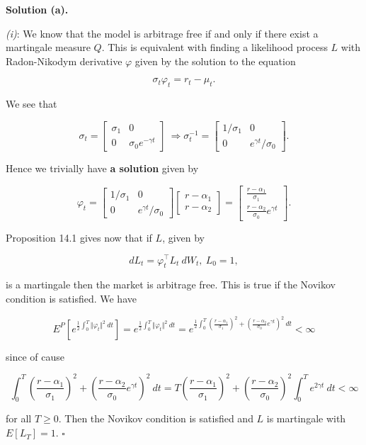 \documentclass[
]{book}
\begin{document}
\textbf{Solution (a).}

\emph{(i)}: We know that the model is arbitrage free if and only if there exist a martingale measure \(Q\). This is equivalent with finding a likelihood process \(L\) with Radon-Nikodym derivative \(\varphi\) given by the solution to the equation

\[
\sigma_t\varphi_t=r_t-\mu_t.
\]

We see that

\[
\sigma_t=
\begin{bmatrix}
\sigma_1 & 0\\
0 & \sigma_0e^{-\gamma t}
\end{bmatrix}\ \Rightarrow
\sigma_t^{-1}=
\begin{bmatrix}
1/\sigma_1 & 0\\
0 & e^{\gamma t}/\sigma_0
\end{bmatrix}.
\]

Hence we trivially have \textbf{a solution} given by

\[
\varphi_t=\begin{bmatrix}
1/\sigma_1 & 0\\
0 & e^{\gamma t}/\sigma_0
\end{bmatrix}\begin{bmatrix}
r-\alpha_1\\
r-\alpha_2
\end{bmatrix}=\begin{bmatrix}
\frac{r-\alpha_1}{\sigma_1}\\
\frac{r-\alpha_2}{\sigma_0}e^{\gamma t}
\end{bmatrix}.
\]

Proposition 14.1 gives now that if \(L\), given by

\[
dL_t=\varphi_t^\top L_t\ dW_t,\ L_0=1,
\]

is a martingale then the market is arbitrage free. This is true if the Novikov condition is satisfied. We have

\[
E^P\left[e^{\frac{1}{2}\int_0^T\Vert\varphi_t\Vert^2\ dt}\right]=e^{\frac{1}{2}\int_0^T\Vert\varphi_t\Vert^2\ dt}= e^{\frac{1}{2}\int_0^T(\frac{r-\alpha_1}{\sigma_1})^2+(\frac{r-\alpha_2}{\sigma_0}e^{\gamma t})^2\ dt}<\infty
\]

since of cause

\[
\int_0^T(\frac{r-\alpha_1}{\sigma_1})^2+(\frac{r-\alpha_2}{\sigma_0}e^{\gamma t})^2\ dt=T(\frac{r-\alpha_1}{\sigma_1})^2+(\frac{r-\alpha_2}{\sigma_0})^2\int_0^Te^{2\gamma t}\ dt<\infty
\]

for all \(T\ge 0\). Then the Novikov condition is satisfied and \(L\) is martingale with \(E[L_T]=1\). \(\square\)
\end{document}
